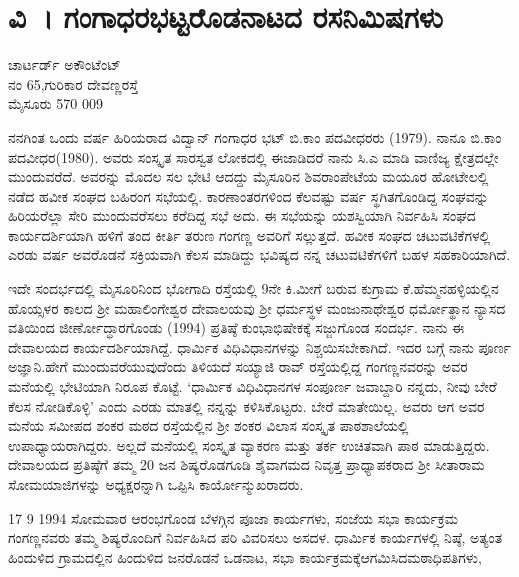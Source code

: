 {\fontsize{14}{16}\selectfont
\chapter{ವಿ~। ಗಂಗಾಧರಭಟ್ಟರೊಡನಾಟದ ರಸನಿಮಿಷಗಳು} 

\begin{center}
\smallskip
ಚಾರ್ಟರ್ಡ್ ಅಕೌಂಟೆಂಟ್\\ 
ನಂ 65,ಗುರಿಕಾರ ದೇವಣ್ಣರಸ್ತೆ\\
ಮೈಸೂರು 570 009 
\addrule	
\end{center}

ನನಗಿಂತ ಒಂದು ವರ್ಷ ಹಿರಿಯರಾದ ವಿದ್ವಾನ್ ಗಂಗಾಧರ ಭಟ್ ಬಿ.ಕಾಂ ಪದವೀಧರರು (1979). ನಾನೂ ಬಿ.ಕಾಂ ಪದವೀಧರ(1980). ಅವರು ಸಂಸ್ಕೃತ ಸಾರಸ್ವತ ಲೋಕದಲ್ಲಿ ಈಜಾಡಿದರೆ ನಾನು ಸಿ.ಎ ಮಾಡಿ ವಾಣಿಜ್ಯ ಕ್ಷೇತ್ರದಲ್ಲೇ ಮುಂದುವರೆದೆ. ಅವರನ್ನು ಮೊದಲ ಸಲ ಭೇಟಿ ಆದದ್ದು ಮೈಸೂರಿನ ಶಿವರಾಂಪೇಟೆಯ ಮಯೂರ ಹೋಟೇಲಲ್ಲಿ ನಡೆದ ಹವೀಕ ಸಂಘದ ಬಹಿರಂಗ ಸಭೆಯಲ್ಲಿ. ಕಾರಣಾಂತರಗಳಿಂದ ಕೆಲವಷ್ಟು ವರ್ಷ ಸ್ಥಗಿತಗೊಂಡಿದ್ದ ಸಂಘವನ್ನು ಹಿರಿಯರೆಲ್ಲಾ ಸೇರಿ ಮುಂದುವರೆಸಲು ಕರೆದಿದ್ದ ಸಭೆ ಅದು. ಈ ಸಭೆಯನ್ನು ಯಶಸ್ವಿಯಾಗಿ ನಿರ್ವಹಿಸಿ ಸಂಘದ ಕಾರ್ಯದರ್ಶಿಯಾಗಿ ಹಳಿಗೆ ತಂದ ಕೀರ್ತಿ ತರುಣ ಗಂಗಣ್ಣ ಅವರಿಗೆ ಸಲ್ಲುತ್ತದೆ. ಹವೀಕ ಸಂಘದ ಚಟುವಟಿಕೆಗಳಲ್ಲಿ ಎರಡು ವರ್ಷ ಅವರೊಡನೆ ಸಕ್ರಿಯವಾಗಿ ಕೆಲಸ ಮಾಡಿದ್ದು ಭವಿಷ್ಯದ ನನ್ನ ಚಟುವಟಿಕೆಗಳಿಗೆ ಬಹಳ ಸಹಕಾರಿಯಾಗಿದೆ.

ಇದೇ ಸಂದರ್ಭದಲ್ಲಿ ಮೈಸೂರಿನಿಂದ ಭೋಗಾದಿ ರಸ್ತೆಯಲ್ಲಿ 9ನೇ ಕಿ.ಮೀಗೆ ಬರುವ ಕುಗ್ರಾಮ ಕೆ.ಹೆಮ್ಮನ\-ಹಳ್ಳಿಯಲ್ಲಿನ ಹೊಯ್ಸಳರ ಕಾಲದ ಶ್ರೀ ಮಹಾಲಿಂಗೇಶ್ವರ ದೇವಾಲಯವು ಶ್ರೀ ಧರ್ಮಸ್ಥಳ ಮಂಜುನಾಥೇಶ್ವರ ಧರ್ಮೋತ್ಥಾನ ನ್ಯಾಸದ ವತಿಯಿಂದ ಜೀರ್ಣೋದ್ಧಾರಗೊಂಡು (1994)    ಪ್ರತಿಷ್ಠೆ  \enginline{-}  ಕುಂಭಾಭಿಷೇಕಕ್ಕೆ ಸಜ್ಜುಗೊಂಡ ಸಂದರ್ಭ. ನಾನು ಈ ದೇವಾಲಯದ ಕಾರ್ಯದರ್ಶಿಯಾಗಿದ್ದೆ. ಧಾರ್ಮಿಕ ವಿಧಿವಿಧಾನಗಳನ್ನು  ನಿಶ್ಚಯಿಸಬೇಕಾಗಿದೆ. ಇದರ ಬಗ್ಗೆ ನಾನು ಪೂರ್ಣ ಅಜ್ಞಾನಿ.ಹೇಗೆ ಮುಂದುವರೆಯುವುದೆಂದು ತಿಳಿಯದೆ ಸಯ್ಯಾಜಿ ರಾವ್ ರಸ್ತೆಯಲ್ಲಿದ್ದ ಗಂಗಣ್ಣನವರನ್ನು ಅವರ ಮನೆಯಲ್ಲಿ ಭೇಟಿಯಾಗಿ ನಿರೂಪ ಕೊಟ್ಟೆ.  ‘ಧಾರ್ಮಿಕ ವಿಧಿವಿಧಾನಗಳ ಸಂಪೂರ್ಣ  ಜವಾಬ್ದಾರಿ ನನ್ನದು, ನೀವು ಬೇರೆ ಕೆಲಸ ನೋಡಿಕೊಳ್ಳಿ’  ಎಂದು ಎರಡು ಮಾತಲ್ಲಿ ನನ್ನನ್ನು ಕಳಿಸಿಕೊಟ್ಟರು. ಬೇರೆ ಮಾತೇಯಿಲ್ಲ. ಅವರು ಆಗ ಅವರ ಮನೆಯ ಸಮೀಪದ ಶಂಕರ ಮಠದ ರಸ್ತೆಯಲ್ಲಿನ ಶ್ರೀ ಶಂಕರ ವಿಲಾಸ ಸಂಸ್ಕೃತ ಪಾಠಶಾಲೆಯಲ್ಲಿ ಉಪಾಧ್ಯಾಯರಾಗಿದ್ದರು. ಅಲ್ಲದೆ ಮನೆಯಲ್ಲಿ ಸಂಸ್ಕೃತ ವ್ಯಾಕರಣ ಮತ್ತು ತರ್ಕ ಉಚಿತವಾಗಿ ಪಾಠ ಮಾಡುತ್ತಿದ್ದರು. ದೇವಾಲಯದ ಪ್ರತಿಷ್ಠೆಗೆ ತಮ್ಮ 20 ಜನ ಶಿಷ್ಯರೊಡಗೂಡಿ ಶೈವಾಗಮದ  ನಿವೃತ್ತ ಪ್ರಾಧ್ಯಾಪಕರಾದ ಶ್ರೀ ಸೀತಾರಾಮ ಸೋಮಯಾಜಿಗಳನ್ನು ಅಧ್ಯಕ್ಷರನ್ನಾಗಿ ಒಪ್ಪಿಸಿ ಕಾರ್ಯೋನ್ಮುಖರಾದರು. 

17  \enginline{-}  9  \enginline{-}  1994 ಸೋಮವಾರ ಆರಂಭಗೊಂಡ ಬೆಳಗ್ಗಿನ ಪೂಜಾ ಕಾರ್ಯಗಳು, ಸಂಜೆಯ ಸಭಾ ಕಾರ್ಯಕ್ರಮ ಗಂಗಣ್ಣನವರು ತಮ್ಮ ಶಿಷ್ಯರೊಂದಿಗೆ ನಿರ್ವಹಿಸಿದ ಪರಿ ವಿವರಿಸಲು ಅಸದಳ. ಧಾರ್ಮಿಕ ಕಾರ್ಯಗಳಲ್ಲಿ ನಿಷ್ಠೆ, ಅತ್ಯಂತ ಹಿಂದುಳಿದ ಗ್ರಾಮದಲ್ಲಿನ ಹಿಂದುಳಿದ ಜನರೊಡನೆ ಒಡನಾಟ, ಸಭಾ ಕಾರ್ಯಕ್ರಮಕ್ಕೆಆಗಮಿಸಿದಮಠಾಧಿಪತಿಗಳು, 
                                                                   
}
